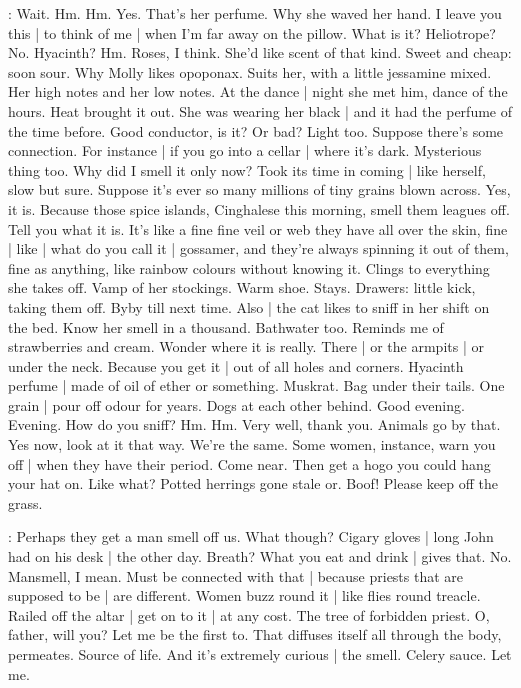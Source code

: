 \Bloom:
Wait.
Hm.
Hm.
Yes.
That's her perfume.
Why she waved her hand.
I leave you this |
to think of me |
when I'm far away on the pillow.
What is it?
Heliotrope?
No.
Hyacinth?
Hm.
Roses,
I think.
She'd like scent of that kind.
Sweet and cheap:
soon sour.%
Why Molly likes opoponax.
Suits her,
with a little jessamine mixed.
Her high notes and her low notes.
At the dance |
night she met him,
dance of the hours.
Heat brought it out.
She was wearing her black |
and it had the perfume of the time before.
Good conductor,
is it?
Or bad?
Light too.
Suppose there's some connection.
For instance |
if you go into a cellar |
where it's dark.
Mysterious thing too.
Why did I smell it only now?
Took its time in coming |
like herself,
slow but sure.
Suppose it's ever so many millions of tiny grains blown across.
Yes,
it is.
Because those spice islands,
Cinghalese this morning,
smell them leagues off.
Tell you what it is.
It's like a fine fine veil
or web they have
all over the skin,
fine |
like |
what do you call it |
gossamer,%
and they're always spinning it out of them,
fine as anything,
like rainbow colours
without knowing it.
Clings to everything she takes off.
Vamp of her stockings.
Warm shoe.
Stays.
Drawers:
little kick,
taking them off.
Byby till next time.
Also |
the cat likes to sniff in her shift
on the bed.
Know her smell in a thousand.
Bathwater too.
Reminds me of strawberries and cream.
Wonder where it is really.
There |
or the armpits |
or under the neck.
Because you get it |
out of all holes and corners.
Hyacinth perfume |
made of oil of ether or something.
Muskrat.
Bag under their tails.
One grain |
pour off odour for years.
Dogs at each other behind.
Good evening.
Evening.
How do you sniff?
Hm.
Hm.
Very well,
thank you.
Animals go by that.%
Yes now,
look at it that way.
We're the same.
Some women,
instance,
warn you off |
when they have their period.
Come near.
Then get a hogo you could hang your hat on.
Like what?
Potted herrings gone stale or.
Boof!
Please keep off the grass.

\Bloom:
Perhaps they get a man smell off us.
What though?
Cigary gloves |
long John had on his desk |
the other day.
Breath?
What you eat and drink |
gives that.
No.
Mansmell,
I mean.
Must be connected with that |
because priests that are supposed to be |
are different.
Women buzz round it |
like flies round treacle.
Railed off the altar |
get on to it |
at any cost.
The tree of forbidden priest.
O,
father,
will you?
Let me be the first to.
That diffuses itself all through the body,
permeates.%
Source of life.
And it's extremely curious |
the smell.
Celery sauce.
Let me.

